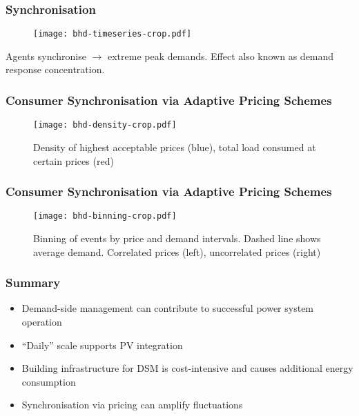 \documentclass[10pt,dvipsnames]{beamer}
\let\olditem\item
\renewcommand{\item}{%
\olditem\vspace{5pt}}
\begin{document}
\begin{frame}
 \frametitle{Synchronisation}

   \begin{figure}
     \texttt{[image: bhd-timeseries-crop.pdf]}
  \end{figure}

 Agents synchronise $\rightarrow$ extreme peak demands. Effect also known as demand response concentration.
\end{frame}
\begin{frame}
  \frametitle{Consumer Synchronisation via Adaptive Pricing Schemes}

    \begin{figure}
     \texttt{[image: bhd-density-crop.pdf]}
     \caption{Density of highest acceptable prices (blue), total load consumed at certain prices (red)}

  \end{figure}
  \end{frame}
\begin{frame}
  \frametitle{Consumer Synchronisation via Adaptive Pricing Schemes}

    \begin{figure}
     \texttt{[image: bhd-binning-crop.pdf]}
    \caption{Binning of events by price and demand intervals. Dashed line shows average demand. Correlated prices (left), uncorrelated prices (right)}
  \end{figure}
  \end{frame}
  \begin{frame}
   \frametitle{Summary}

   \begin{itemize}
    \item Demand-side management can contribute to successful power system operation
    \item ``Daily'' scale supports PV integration
    \item Building infrastructure for DSM is cost-intensive and causes additional energy consumption
    \item Synchronisation via pricing can amplify fluctuations
   \end{itemize}


  \end{frame}
\end{document}

